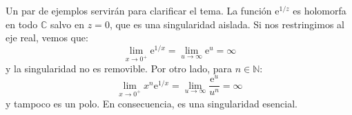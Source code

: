   Un par de ejemplos servirán para clarificar el tema.
  La función \(\mathrm{e}^{1 / z}\)
  es holomorfa en todo \(\mathbb{C}\)
  salvo en \(z = 0\),
  que es una singularidad aislada.
  Si nos restringimos al eje real,
  vemos que:
  \begin{equation*}
    \lim_{x \rightarrow 0^+} \mathrm{e}^{1 / x}
      = \lim_{u \rightarrow \infty} \mathrm{e}^u
      = \infty
  \end{equation*}
  y la singularidad no es removible.
  Por otro lado,
  para \(n \in \mathbb{N}\):
  \begin{equation*}
    \lim_{x \rightarrow 0^+} x^n \mathrm{e}^{1 / x}
      = \lim_{u \rightarrow \infty} \frac{\mathrm{e}^u}{u^n}
      = \infty
  \end{equation*}
  y tampoco es un polo.
  En consecuencia,
  es una singularidad esencial.

